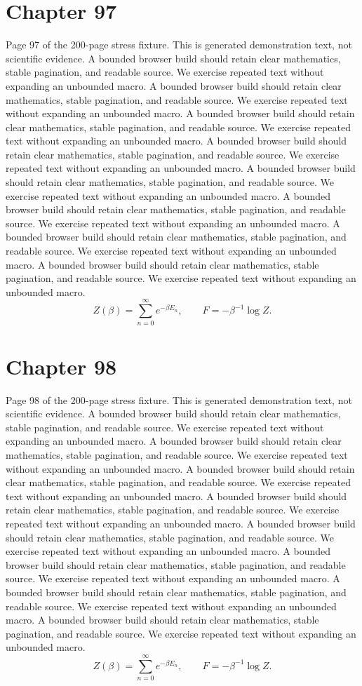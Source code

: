 \documentclass[11pt]{article}
\begin{document}
\section*{Chapter 97}
Page 97 of the 200-page stress fixture. This is generated demonstration text, not scientific evidence.
A bounded browser build should retain clear mathematics, stable pagination, and readable source. We exercise repeated text without expanding an unbounded macro.
A bounded browser build should retain clear mathematics, stable pagination, and readable source. We exercise repeated text without expanding an unbounded macro.
A bounded browser build should retain clear mathematics, stable pagination, and readable source. We exercise repeated text without expanding an unbounded macro.
A bounded browser build should retain clear mathematics, stable pagination, and readable source. We exercise repeated text without expanding an unbounded macro.
A bounded browser build should retain clear mathematics, stable pagination, and readable source. We exercise repeated text without expanding an unbounded macro.
A bounded browser build should retain clear mathematics, stable pagination, and readable source. We exercise repeated text without expanding an unbounded macro.
A bounded browser build should retain clear mathematics, stable pagination, and readable source. We exercise repeated text without expanding an unbounded macro.
A bounded browser build should retain clear mathematics, stable pagination, and readable source. We exercise repeated text without expanding an unbounded macro.
\[Z(\beta)=\sum_{n=0}^{\infty}e^{-\beta E_n},\qquad F=-\beta^{-1}\log Z.\]
\newpage
\section*{Chapter 98}
Page 98 of the 200-page stress fixture. This is generated demonstration text, not scientific evidence.
A bounded browser build should retain clear mathematics, stable pagination, and readable source. We exercise repeated text without expanding an unbounded macro.
A bounded browser build should retain clear mathematics, stable pagination, and readable source. We exercise repeated text without expanding an unbounded macro.
A bounded browser build should retain clear mathematics, stable pagination, and readable source. We exercise repeated text without expanding an unbounded macro.
A bounded browser build should retain clear mathematics, stable pagination, and readable source. We exercise repeated text without expanding an unbounded macro.
A bounded browser build should retain clear mathematics, stable pagination, and readable source. We exercise repeated text without expanding an unbounded macro.
A bounded browser build should retain clear mathematics, stable pagination, and readable source. We exercise repeated text without expanding an unbounded macro.
A bounded browser build should retain clear mathematics, stable pagination, and readable source. We exercise repeated text without expanding an unbounded macro.
A bounded browser build should retain clear mathematics, stable pagination, and readable source. We exercise repeated text without expanding an unbounded macro.
\[Z(\beta)=\sum_{n=0}^{\infty}e^{-\beta E_n},\qquad F=-\beta^{-1}\log Z.\]
\newpage
\end{document}

